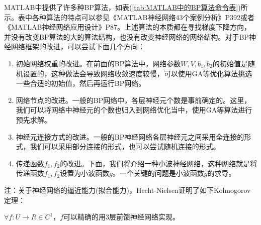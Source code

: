 {\begin{table}[htbp]
\begin{tabular}{l l l}
              \bottomrule
              \end{tabular}
            \end{table}
            \par
            MATLAB中提供了许多种BP算法，如表(\ref{tab:MATLAB中的BP算法命令表})所示。表中各种算法的特点可以参见《MATLAB神经网络43个案例分析》P392或者《MATLAB神经网络应用设计》P87。上述算法的本质都在寻找梯度下降方向，并没有改变BP算法的大的算法结构，也没有改变神经网络的网络结构。对于BP神经网络框架的改进，可以尝试下面几个方向：
            \begin{enumerate}
            \item 初始网络权重的改进。在前面的BP算法中，网络参数$W,V,b_1,b_2$的初始值是随机设置的，这种做法会导致网络收敛速度较慢，可以使用GA等优化算法挑选一些合适的初始值，然后再运行BP网络。
            \item 网络节点的改进。一般的BP网络中，各层神经元个数是事前确定的。这里，我们可以将网络中神经元的个数也归入到网络优化当中，使用GA等算法进行预先求解。
            \item 神经元连接方式的改进。一般的BP神经网络各层神经元之间采用全连接的形式，我们可以采用部分连接的形式，也可以尝试随机连接的形式。
            \item 传递函数$f_1,f_2$的改进。下面，我们将介绍一种小波神经网络，这种网络就是将传递函数$f_1,f_2$设置为小波函数$g$。一个关键的问题是小波函数$g$的求导。
            \end{enumerate}
            \par
            注：关于神经网络的逼近能力(拟合能力)，Hecht-Nielsen证明了如下Kolmogorov定理：
            \begin{theorem}[Kolmogorov定理]
            $\forall f:U\to R\in C^1$，$f$可以精确的用3层前馈神经网络实现。
            \end{theorem}
}
